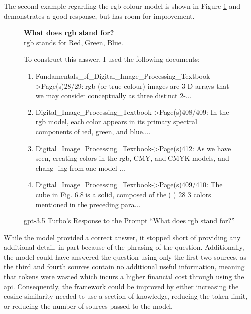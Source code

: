 The second example regarding the \acrshort{rgb} colour model is shown in Figure \ref{fig:results_gpt_ex2} and demonstrates a good response, but has room for improvement. 

\begin{figure}[ht!]
    \begin{itquote}
        \textbf{What does \acrshort{rgb} stand for?} \\ 
        \acrshort{rgb} stands for Red, Green, Blue.
        
        To construct this answer, I used the following documents:
           
        \begin{enumerate}
            \item Fundamentals\_of\_Digital\_Image\_Processing\_Textbook->Page(s)28/29:  \acrshort{rgb} (or true colour) images are 3-D arrays that we may consider conceptually as three  distinct 2-...
            \item Digital\_Image\_Processing\_Textbook->Page(s)408/409:  In the \acrshort{rgb} model, each color appears in its primary spectral components of red,   green, and blue....
            \item Digital\_Image\_Processing\_Textbook->Page(s)412:  As we have seen, creating colors in the \acrshort{rgb}, CMY, and CMYK models, and chang-   ing from one model ...
            \item Digital\_Image\_Processing\_Textbook->Page(s)409/410:  The cube in Fig. 6.8 is a solid, composed of the (  )  28 3 colors mentioned in the preceding para...
        \end{enumerate}
    \end{itquote}
    \caption{\acrshort{gpt}-3.5 Turbo's Response to the Prompt ``What does \acrshort{rgb} stand for?''}
    \label{fig:results_gpt_ex2}
\end{figure}

While the model provided a correct answer, it stopped short of providing any additional detail, in part because of the phrasing of the question. Additionally, the model could have answered the question using only the first two sources, as the third and fourth sources contain no additional useful information, meaning that tokens were wasted which incurs a higher financial cost through using the \acrshort{api}. Consequently, the framework could be improved by either increasing the cosine similarity needed to use a section of knowledge, reducing the token limit, or reducing the number of sources passed to the model.

